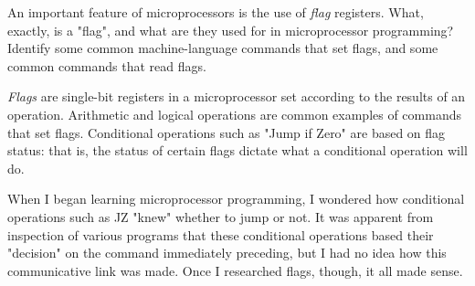 

An important feature of microprocessors is the use of {\it flag} registers.  What, exactly, is a "flag", and what are they used for in microprocessor programming?  Identify some common machine-language commands that set flags, and some common commands that read flags.







{\it Flags} are single-bit registers in a microprocessor set according to the results of an operation.  Arithmetic and logical operations are common examples of commands that set flags.  Conditional operations such as "Jump if Zero" are based on flag status: that is, the status of certain flags dictate what a conditional operation will do.







When I began learning microprocessor programming, I wondered how conditional operations such as JZ "knew" whether to jump or not.  It was apparent from inspection of various programs that these conditional operations based their "decision" on the command immediately preceding, but I had no idea how this communicative link was made.  Once I researched flags, though, it all made sense.




